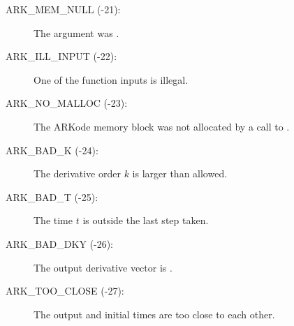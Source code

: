 \documentclass[letterpaper,10pt,english]{sphinxmanual}
\begin{document}
\begin{description}
\item[{ARK\_MEM\_NULL  (-21):}] \leavevmode
The  argument was .

\item[{ARK\_ILL\_INPUT  (-22):}] \leavevmode
One of the function inputs is illegal.

\item[{ARK\_NO\_MALLOC  (-23):}] \leavevmode
The ARKode memory block was not allocated by
a call to .

\item[{ARK\_BAD\_K  (-24):}] \leavevmode
The derivative order $k$ is larger than allowed.

\item[{ARK\_BAD\_T  (-25):}] \leavevmode
The time $t$ is outside the last step taken.

\item[{ARK\_BAD\_DKY  (-26):}] \leavevmode
The output derivative vector is .

\item[{ARK\_TOO\_CLOSE  (-27):}] \leavevmode
The output and initial times are too close to
each other.

\end{description}
\end{document}
